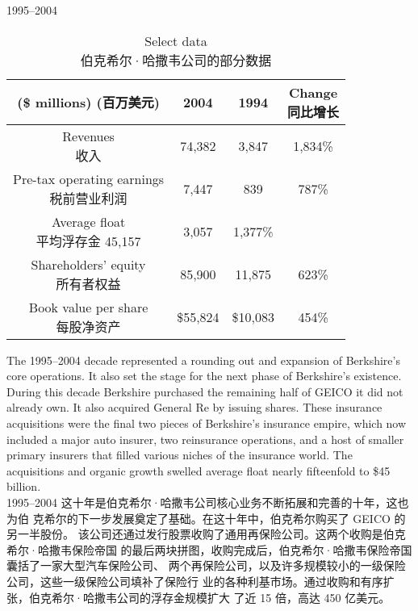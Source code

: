 \begin{section}{1995--2004}

\begin{table}[!htbp]
  \centering
  \begin{center}
    \begin{tabular}{cccc}
      \toprule
      \makecell[c]{(\$ millions) \\ (百万美元)} & 2004 & 1994 & \makecell[c]{Change \\ 同比增长} \\
      \midrule
      \makecell[c]{Revenues \\ 收入} & 74,382 & 3,847 & 1,834\% \\
      \makecell[c]{Pre-tax operating earnings \\ 税前营业利润} & 7,447 & 839 & 787\% \\
      \makecell[c]{Average float \\ 平均浮存金} 45,157 & 3,057 & 1,377\% \\
      \makecell[c]{Shareholders' equity \\ 所有者权益} & 85,900 & 11,875 & 623\% \\
      \makecell[c]{Book value per share \\ 每股净资产} & \$55,824 & \$10,083 & 454\% \\
      \bottomrule
    \end{tabular}
    \caption{Select data \\ 伯克希尔·哈撒韦公司的部分数据}
  \end{center}
\end{table}

\begin{verseparallel}
  {
    The 1995–2004 decade represented a rounding out and expansion of
    Berkshire's core operations. It also set the stage for the next phase of
    Berkshire's existence. During this decade Berkshire purchased the
    remaining half of GEICO it did not already own. It also acquired General
    Re by issuing shares. These insurance acquisitions were the final two pieces
    of Berkshire's insurance empire, which now included a major auto insurer,
    two reinsurance operations, and a host of smaller primary insurers that
    filled various niches of the insurance world. The acquisitions and organic
    growth swelled average float nearly fifteenfold to \$45 billion. \\
  }
  {
    1995--2004 这十年是伯克希尔·哈撒韦公司核心业务不断拓展和完善的十年，这也为伯
    克希尔的下一步发展奠定了基础。在这十年中，伯克希尔购买了 GEICO 的另一半股份。
    该公司还通过发行股票收购了通用再保险公司。这两个收购是伯克希尔·哈撒韦保险帝国
    的最后两块拼图，收购完成后，伯克希尔·哈撒韦保险帝国囊括了一家大型汽车保险公司、
    两个再保险公司，以及许多规模较小的一级保险公司，这些一级保险公司填补了保险行
    业的各种利基市场。通过收购和有序扩张，伯克希尔·哈撒韦公司的浮存金规模扩大
    了近 15 倍，高达 450 亿美元。
  }
\end{verseparallel}


\end{section}
